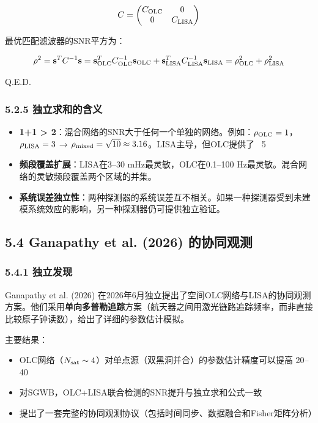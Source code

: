 \documentclass[12pt,a4paper]{article}
\begin{document}
$$C = \begin{pmatrix} C_{\rm OLC} & 0 \\ 0 & C_{\rm LISA} \end{pmatrix}$$

最优匹配滤波器的SNR平方为：

$$\rho^2 = {\bf s}^T C^{-1} {\bf s} = {\bf s}_{\rm OLC}^T C_{\rm OLC}^{-1} {\bf s}_{\rm OLC} + {\bf s}_{\rm LISA}^T C_{\rm LISA}^{-1} {\bf s}_{\rm LISA} = \rho_{\rm OLC}^2 + \rho_{\rm LISA}^2$$

Q.E.D.

\subsubsection{5.2.5 独立求和的含义}


\begin{itemize}
  \item[1] \textbf{1+1 > 2}：混合网络的SNR大于任何一个单独的网络。例如：$\rho_{\rm OLC} = 1$，$\rho_{\rm LISA} = 3$ → $\rho_{\rm mixed} = \sqrt{10} \approx 3.16$。LISA主导，但OLC提供了 ~5%

  \item[2] \textbf{频段覆盖扩展}：LISA在3–30 mHz最灵敏，OLC在0.1–100 Hz最灵敏。混合网络的灵敏频段覆盖两个区域的并集。

  \item[3] \textbf{系统误差独立性}：两种探测器的系统误差互不相关。如果一种探测器受到未建模系统效应的影响，另一种探测器仍可提供独立验证。

\end{itemize}
\subsection{5.4 Ganapathy et al. (2026) 的协同观测}


\subsubsection{5.4.1 独立发现}


Ganapathy et al. (2026) 在2026年6月独立提出了空间OLC网络与LISA的协同观测方案\cite{ref11}。他们采用\textbf{单向多普勒追踪}方案（航天器之间用激光链路追踪频率，而非直接比较原子钟读数），给出了详细的参数估计模拟。

主要结果：
\begin{itemize}
  \item OLC网络（$N_{\rm sat} \sim 4$）对单点源（双黑洞并合）的参数估计精度可以提高 20–40%
  \item 对SGWB，OLC+LISA联合检测的SNR提升与独立求和公式一致
  \item 提出了一套完整的协同观测协议（包括时间同步、数据融合和Fisher矩阵分析）

\end{itemize}
\end{document}
